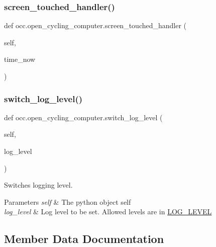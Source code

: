 \subsubsection{\texorpdfstring{screen\+\_\+touched\+\_\+handler()}{screen\_touched\_handler()}}
{\footnotesize\ttfamily def occ.\+open\+\_\+cycling\+\_\+computer.\+screen\+\_\+touched\+\_\+handler (\begin{DoxyParamCaption}\item[{}]{self,  }\item[{}]{time\+\_\+now }\end{DoxyParamCaption})}

\mbox{\label{classocc_1_1open__cycling__computer_a26649854452d1afcfebf0b3d17ac347d}} 
\subsubsection{\texorpdfstring{switch\+\_\+log\+\_\+level()}{switch\_log\_level()}}
{\footnotesize\ttfamily def occ.\+open\+\_\+cycling\+\_\+computer.\+switch\+\_\+log\+\_\+level (\begin{DoxyParamCaption}\item[{}]{self,  }\item[{}]{log\+\_\+level }\end{DoxyParamCaption})}



Switches logging level. 


\begin{DoxyParams}{Parameters}
{\em self} & The python object self \\
\hline
{\em log\+\_\+level} & Log level to be set. Allowed levels are in \hyperlink{namespaceocc_a46db66163eeb50234471c2f1f0bf4133}{L\+O\+G\+\_\+\+L\+E\+V\+EL} \\
\hline
\end{DoxyParams}


\subsection{Member Data Documentation}
\mbox{\label{classocc_1_1open__cycling__computer_af56c12bbd4cf026b59578e22b922c846}} 
